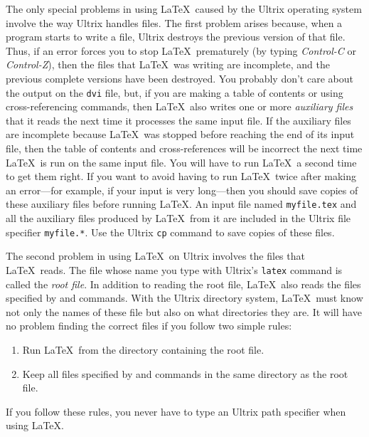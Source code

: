 The only special problems in using \LaTeX\ caused by the Ultrix
operating system involve the way Ultrix handles files.  The first
problem arises because, when a program starts to write a file, Ultrix
destroys the previous version of that file.  Thus, if an error forces
you to stop \LaTeX\ prematurely (by typing {\em Control-C\/} or {\em
Control-Z\/}), then the files that \LaTeX\ was writing are incomplete,
and the previous complete versions have been destroyed.  You probably
don't care about the output on the {\tt dvi} file, but, if you are
making a table of contents or using cross-referencing commands, then
\LaTeX\ also writes one or more {\em auxiliary files\/} that it reads
the next time it processes the same input file.  If the auxiliary files
are incomplete because \LaTeX\ was stopped before reaching the end of
its input file, then the table of contents and cross-references will be
incorrect the next time \LaTeX\ is run on the same input file.  You
will have to run \LaTeX\ a second time to get them right.  If you want
to avoid having to run \LaTeX\ twice after making an error---for
example, if your input is very long---then you should save copies of
these auxiliary files before running \LaTeX. An input file named
\mbox{\tt myfile.tex} and all the auxiliary files produced by \LaTeX\
from it are included in the Ultrix file specifier \mbox{\tt myfile.*}.
Use the Ultrix {\tt cp} command to save copies of these files.

The second problem in using \LaTeX\ on Ultrix involves the files that
\LaTeX\ reads.  The file whose name you type with Ultrix's {\tt latex}
command is called the {\em root file}.  In addition to reading the root
file, \LaTeX\ also reads the files specified by \hbox{\verb||}
and \hbox{\verb||} commands.  With the Ultrix directory system,
\LaTeX\ must know not only the names of these file but also on what
directories they are.  It will have no problem finding the correct
files if you follow two simple rules:
\begin{enumerate}
 \item Run \LaTeX\ from the directory containing the root file.
 \item Keep all files specified by \hbox{\verb||} and 
      \hbox{\verb||} commands in the same directory as the root
       file.
\end{enumerate}
If you follow these rules, you never have to type an Ultrix path
specifier when using \LaTeX.

